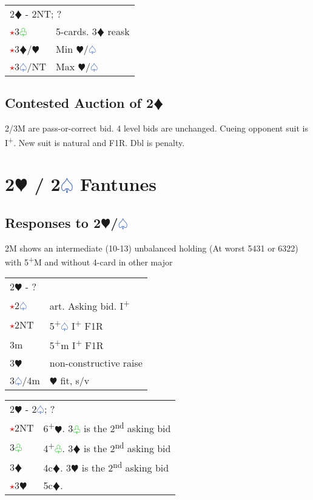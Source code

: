 \documentclass{article}
\renewcommand{\sp}{\textcolor{RoyalBlue}{$\varspade$}}
\newcommand{\he}{\textcolor{RubineRed}{$\varheart$}}
\newcommand{\di}{\textcolor{Peach}{$\vardiamond$}}
\newcommand{\cl}{\textcolor{LimeGreen}{$\varclub$}}
\newcommand{\nt}{\relsize{-1}NT\relsize{1}}
\newcommand{\up}{\textsuperscript{+}}
\newcommand{\al}{\textcolor{red}{$\star$}}
\begin{document}
\medskip

\begin{tabular}{|l|p{6.5cm}}
	\multicolumn{2}{l}{2\di{} - 2\nt{}; ?}\\
	\al{}3\cl{} & 5-cards. 3\di{} reask \\
	\al{}3\di{}/\he{} & Min \he{}/\sp{} \\
	\al{}3\sp{}/\nt{} & Max \he{}/\sp{} \\
\end{tabular}

\subsection{Contested Auction of 2\di{}}
2/3M are pass-or-correct bid. 4 level bids are unchanged. Cueing opponent suit is I\up{}. New suit is natural and F1R. Dbl is penalty.

\section{2\he{} / 2\sp{} Fantunes}

\subsection{Responses to 2\he{}/\sp{}}

2M shows an intermediate (10-13) unbalanced holding (At worst 5431 or 6322) with 5\up{}M and without 4-card in other major \\

\begin{tabular}{|l|p{6.5cm}}
	\multicolumn{2}{l}{2\he{} -  ?} \\
	\al{}2\sp & art. Asking bid. I\up \\
	\al{}2\nt & 5\up\sp{} I\up{} F1R \\
    3m & 5\up{}m I\up{} F1R \\
    3\he & non-constructive raise \\
    3\sp{}/4m & \he{} fit, s/v 
\end{tabular}

\medskip

\begin{tabular}{|l|p{6.5cm}}
	\multicolumn{2}{l}{2\he{} - 2\sp{}; ?}\\
	\al{}2\nt & 6\up\he{}. 3\cl{} is the 2\textsuperscript{nd} asking bid \\
	3\cl & 4\up\cl{}. 3\di{} is the 2\textsuperscript{nd} asking bid \\
	3\di & 4c\di{}. 3\he{} is the 2\textsuperscript{nd} asking bid \\
	\al{}3\he & 5c\di{}. 
\end{tabular}
\end{document}

